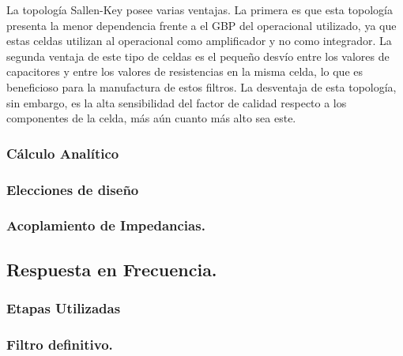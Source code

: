 La topología Sallen-Key posee varias ventajas. La primera es que esta topología presenta la menor dependencia frente a el GBP del operacional utilizado, ya que estas celdas utilizan al operacional como amplificador y no como integrador. La segunda ventaja de este tipo de celdas es el pequeño desvío entre los valores de capacitores y entre los valores de resistencias en la misma celda, lo que es beneficioso para la manufactura de estos filtros. La desventaja de esta topología, sin embargo, es la alta sensibilidad del factor de calidad respecto a los componentes de la celda, más aún cuanto más alto sea este. 

\subsubsection{Cálculo Analítico}

\subsubsection{Elecciones de diseño}

\subsubsection{Acoplamiento de Impedancias.}

\subsection{Respuesta en Frecuencia.}

\subsubsection{Etapas Utilizadas}

\subsubsection{Filtro definitivo.}



